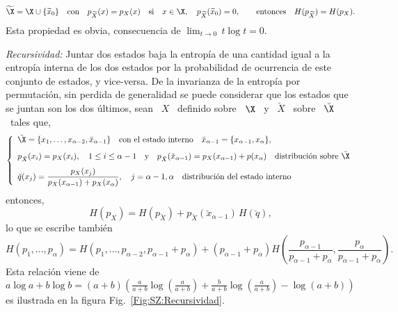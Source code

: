 \begin{propiedades}
  \[
  \widetilde{\X}  =  \X  \cup  \{  \widetilde{x}_0  \}  \quad  \mbox{con}  \quad
  p_{\widetilde{X}}(x)  =   p_X(x)  \quad  \mbox{si}  \quad  x   \in  \X,  \quad
  p_{\widetilde{X}}(\widetilde{x}_0)   =   0,   \qquad   \mbox{entonces}   \quad
  H(p_{\widetilde{X}}) = H(p_X).
  \]
  Esta propiedad  es obvia, consecuencia de  $\displaystyle \lim_{t \to  0} \, t
  \log t = 0$.
%
\setcounter{PropRecursividad}{\value{enumi}}
\item\label{Prop:SZ:recursividad} {\it Recursividad:} Juntar dos estados baja la
  entrop\'ia de  una cantidad igual a  la entrop\'ia interna de  los dos estados
  por  la   probabilidad  de   ocurrencia  de  este   conjunto  de   estados,  y
  vice-versa. De la  invarianza de la entrop\'ia por  permutaci\'on, sin perdida
  de generalidad se  puede considerar que los estados que se  juntan son los dos
  \'ultimos, \ie sean \ $X$ \ definido  sobre \ $\X$ \ y \ $\breve{X}$ \ sobre
  \ $\breve{\X}$ \ tales que,
  \[
  \left\{  \begin{array}{l}\breve{\X}  = \{  x_1  ,  \ldots  , x_{\alpha-2}  ,
      \breve{x}_{\alpha-1}\} \quad \mbox{con el estado interno} \quad
      \breve{x}_{\alpha-1}   =  \{   x_{\alpha-1}  ,   x_\alpha  \},\\[2.5mm]
      p_{\breve{X}}(x_i) = p_X(x_i), \quad 1 \le i \le \alpha-1 \quad \mbox{y}
      \quad p_{\breve{X}}(\breve{x}_{\alpha-1}) = p_X(x_{\alpha-1}) +
      p(x_\alpha)  \quad  \mbox{distribuci\'on  sobre  }  \breve{\X}\\[2.5mm]
      \displaystyle   \breve{q}(x_j)  =   \frac{p_X(x_j)}{p_X(x_{\alpha-1})  +
        p_X(x_\alpha)},  \quad j =  \alpha-1, \alpha  \quad \mbox{distribuci\'on
        del estado interno}\end{array}\right.
  \]
  entonces,
  \[
  H(p_X)  =   H(p_{\breve{X}})  +  p_{\breve{X}}(\breve{x}_{\alpha-1})  \,
  H(\breve{q}),
  \]
  lo que se escribe tambi\'en
  \[
  H(p_1,\ldots,p_\alpha)  =  H(p_1,\ldots,p_{\alpha-2},p_{\alpha-1}+p_\alpha)  +
  \left(             p_{\alpha-1}+p_\alpha            \right)            H\left(
    \frac{p_{\alpha-1}}{p_{\alpha-1}+p_\alpha}                                  ,
    \frac{p_\alpha}{p_{\alpha-1}+p_\alpha}\right).
  \]
  Esta relaci\'on  viene de $a \log  a + b  \log b = (a+b)  \left( \frac{a}{a+b}
    \log\left(  \frac{a}{a+b} \right)  + \frac{b}{a+b}  \log\left( \frac{a}{a+b}
    \right)   -   \log(  a   +   b  )\right)$   es   ilustrada   en  la   figura
  Fig.~\ref{Fig:SZ:Recursividad}.\newline

\end{propiedades}
